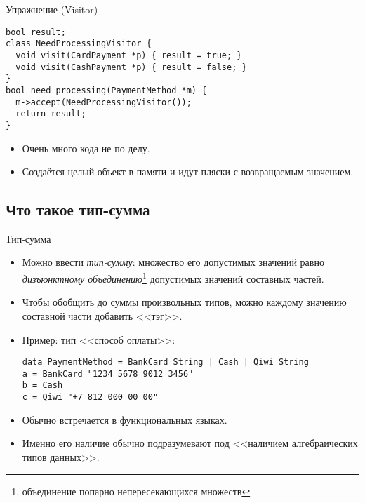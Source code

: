 \begin{frame}[fragile]{Упражнение (Visitor)}
\begin{verbatim}
bool result;
class NeedProcessingVisitor {
  void visit(CardPayment *p) { result = true; }
  void visit(CashPayment *p) { result = false; }
}
bool need_processing(PaymentMethod *m) {
  m->accept(NeedProcessingVisitor());
  return result;
}
\end{verbatim}
	\begin{itemize}
		\item Очень много кода не по делу.
		\item Создаётся целый объект в памяти и идут пляски с возвращаемым значением.
	\end{itemize}
\end{frame}

\subsection{Что такое тип-сумма}
\begin{frame}[fragile]{Тип-сумма}
	\begin{itemize}
		\item Можно ввести \textit{тип-сумму}: множество его допустимых значений равно \textit{дизъюнктному объединению}\footnote{объединение попарно непересекающихся множеств} допустимых значений составных частей.
		\item Чтобы обобщить до суммы произвольных типов, можно каждому значению составной части добавить <<тэг>>.
		\item Пример: тип <<способ оплаты>>:
\begin{verbatim}
data PaymentMethod = BankCard String | Cash | Qiwi String
a = BankCard "1234 5678 9012 3456"
b = Cash
c = Qiwi "+7 812 000 00 00"
\end{verbatim}
		\item Обычно встречается в функциональных языках.
		\item Именно его наличие обычно подразумевают под <<наличием алгебраических типов данных>>.
	\end{itemize}
\end{frame}

